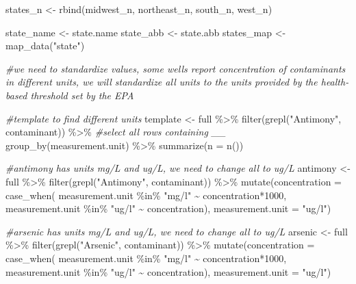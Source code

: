 \documentclass[12pt, twoside]{amherstthesis}
\newenvironment{Shaded}{\begin{snugshade}}{\end{snugshade}}
\newcommand{\AttributeTok}[1]{\textcolor[rgb]{0.77,0.63,0.00}{#1}}
\newcommand{\CommentTok}[1]{\textcolor[rgb]{0.56,0.35,0.01}{\textit{#1}}}
\newcommand{\DecValTok}[1]{\textcolor[rgb]{0.00,0.00,0.81}{#1}}
\newcommand{\FunctionTok}[1]{\textcolor[rgb]{0.00,0.00,0.00}{#1}}
\newcommand{\NormalTok}[1]{#1}
\newcommand{\OtherTok}[1]{\textcolor[rgb]{0.56,0.35,0.01}{#1}}
\newcommand{\SpecialCharTok}[1]{\textcolor[rgb]{0.00,0.00,0.00}{#1}}
\newcommand{\StringTok}[1]{\textcolor[rgb]{0.31,0.60,0.02}{#1}}
\begin{document}
\begin{Shaded}
\begin{Highlighting}[]
\NormalTok{states\_n }\OtherTok{\textless{}{-}} \FunctionTok{rbind}\NormalTok{(midwest\_n, northeast\_n, south\_n, west\_n)}

\NormalTok{state\_name }\OtherTok{\textless{}{-}}\NormalTok{ state.name}
\NormalTok{state\_abb }\OtherTok{\textless{}{-}}\NormalTok{ state.abb}
\NormalTok{states\_map }\OtherTok{\textless{}{-}} \FunctionTok{map\_data}\NormalTok{(}\StringTok{"state"}\NormalTok{)}
\end{Highlighting}
\end{Shaded}
\begin{Shaded}
\begin{Highlighting}[]
\CommentTok{\#we need to standardize values, some wells report concentration of contaminants in different units, we will standardize all units to the units provided by the health{-}based threshold set by the EPA}

\CommentTok{\#template to find different units}
\NormalTok{template }\OtherTok{\textless{}{-}}\NormalTok{ full }\SpecialCharTok{\%\textgreater{}\%}
  \FunctionTok{filter}\NormalTok{(}\FunctionTok{grepl}\NormalTok{(}\StringTok{"Antimony"}\NormalTok{, contaminant)) }\SpecialCharTok{\%\textgreater{}\%} \CommentTok{\#select all rows containing \_\_}
  \FunctionTok{group\_by}\NormalTok{(measurement.unit) }\SpecialCharTok{\%\textgreater{}\%}
  \FunctionTok{summarize}\NormalTok{(}\AttributeTok{n =} \FunctionTok{n}\NormalTok{())}

\CommentTok{\#antimony has units mg/L and ug/L, we need to change all to ug/L}
\NormalTok{antimony }\OtherTok{\textless{}{-}}\NormalTok{ full }\SpecialCharTok{\%\textgreater{}\%}
  \FunctionTok{filter}\NormalTok{(}\FunctionTok{grepl}\NormalTok{(}\StringTok{"Antimony"}\NormalTok{, contaminant)) }\SpecialCharTok{\%\textgreater{}\%}
  \FunctionTok{mutate}\NormalTok{(}\AttributeTok{concentration =} 
           \FunctionTok{case\_when}\NormalTok{(}
\NormalTok{             measurement.unit }\SpecialCharTok{\%in\%} \StringTok{"mg/l"} \SpecialCharTok{\textasciitilde{}}\NormalTok{ concentration}\SpecialCharTok{*}\DecValTok{1000}\NormalTok{,}
\NormalTok{             measurement.unit }\SpecialCharTok{\%in\%} \StringTok{"ug/l"} \SpecialCharTok{\textasciitilde{}}\NormalTok{ concentration),}
         \AttributeTok{measurement.unit =} \StringTok{"ug/l"}\NormalTok{)}
  
\CommentTok{\#arsenic has units mg/L and ug/L, we need to change all to ug/L}
\NormalTok{arsenic }\OtherTok{\textless{}{-}}\NormalTok{ full }\SpecialCharTok{\%\textgreater{}\%}
  \FunctionTok{filter}\NormalTok{(}\FunctionTok{grepl}\NormalTok{(}\StringTok{"Arsenic"}\NormalTok{, contaminant)) }\SpecialCharTok{\%\textgreater{}\%}
  \FunctionTok{mutate}\NormalTok{(}\AttributeTok{concentration =} 
           \FunctionTok{case\_when}\NormalTok{(}
\NormalTok{             measurement.unit }\SpecialCharTok{\%in\%} \StringTok{"mg/l"} \SpecialCharTok{\textasciitilde{}}\NormalTok{ concentration}\SpecialCharTok{*}\DecValTok{1000}\NormalTok{,}
\NormalTok{             measurement.unit }\SpecialCharTok{\%in\%} \StringTok{"ug/l"} \SpecialCharTok{\textasciitilde{}}\NormalTok{ concentration),}
         \AttributeTok{measurement.unit =} \StringTok{"ug/l"}\NormalTok{)}


\end{Highlighting}
\end{Shaded}
\end{document}
